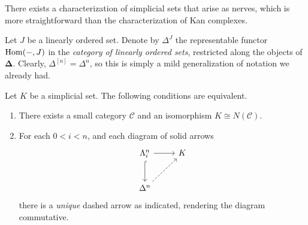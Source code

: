 There exists a characterization of simplicial sets that arise as nerves, which is more straightforward than the characterization of Kan complexes.

\begin{notation}\label{1.1.2.4}
	Let $J$ be a linearly ordered set. Denote by $\Delta^J$ the representable functor $\operatorname{Hom}(-, J) $ in the \emph{category of linearly ordered sets}, restricted along the objects of $\boldsymbol{\Delta} $. Clearly, $\Delta^{[n]} =\Delta^n$, so this is simply a mild generalization of notation we already had.
\end{notation}


\begin{proposition}\label{1.1.2.5}
	Let $K$ be a simplicial set. The following conditions are equivalent.
	\begin{enumerate}
		\item There exists a small category $\mathcal{C} $ and an isomorphism $K\cong N(\mathcal{C} )$.
		\item For each $0<i<n$, and each diagram of solid arrows
			\[\begin{tikzcd}[row sep = 2.5em, column sep = 2.5em]
			\Lambda_i^n\ar[r] \ar[hook, d]  & K \\
			\Delta^n \ar[dashed, ur]  & 
			\end{tikzcd}\]
			there is a \emph{unique} dashed arrow as indicated, rendering the diagram commutative.
	\end{enumerate}
\end{proposition}
